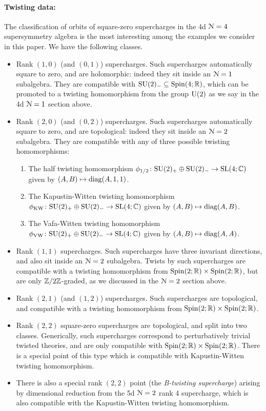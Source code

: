 \documentclass[10pt, oneside]{article}
\begin{document}
\paragraph{Twisting data:}
The classification of orbits of square-zero supercharges in the 4d $\mathcal{N}=4$ supersymmetry algebra is the most interesting among the examples we consider in this paper.  We have the following classes. 
\begin{itemize}
 \item Rank $(1,0)$ (and $(0,1)$) supercharges.  Such supercharges automatically square to zero, and are holomorphic: indeed they sit inside an $\mathcal{N}=1$ subalgebra.  They are compatible with $\mathrm{SU}(2)_- \subseteq \mathrm{Spin}(4;\mathbb R)$, which can be promoted to a twisting homomorphism from the group $\mathrm{U}(2)$ as we say in the 4d $\mathcal{N}=1$ section above.
 \item Rank $(2,0)$ (and $(0,2)$) supercharges.  Such supercharges automatically square to zero, and are topological: indeed they sit inside an $\mathcal{N}=2$ subalgebra.  They are compatible with any of three possible twisting homomorphisms:
 \begin{enumerate}
  \item The half twisting homomorphism $\phi_{\mathrm{1/2}} \colon \mathrm{SU}(2)_+ \oplus \mathrm{SU}(2)_- \to \mathrm{SL}(4;\mathbb C)$ given by $(A,B) \mapsto \mathrm{diag}(A, 1, 1)$.
  \item The Kapustin-Witten twisting homomorphism $\phi_{\mathrm{KW}} \colon \mathrm{SU}(2)_+ \oplus \mathrm{SU}(2)_- \to \mathrm{SL}(4;\mathbb C)$ given by $(A,B) \mapsto \mathrm{diag}(A, B)$.
  \item The Vafa-Witten twisting homomorphism $\phi_{\mathrm{VW}} \colon \mathrm{SU}(2)_+ \oplus \mathrm{SU}(2)_- \to \mathrm{SL}(4;\mathbb C)$ given by $(A,B) \mapsto \mathrm{diag}(A, A)$.
 \end{enumerate}
 \item Rank $(1,1)$ supercharges.  Such supercharges have three invariant directions, and also sit inside an $\mathcal{N}=2$ subalgebra.  Twists by such supercharges are compatible with a twisting homomorphism from $\mathrm{Spin}(2;\mathbb R) \times \mathrm{Spin}(2;\mathbb R)$, but are only $\mathbb Z/2\mathbb Z$-graded, as we discussed in the $\mathcal{N}=2$ section above.
 \item Rank $(2,1)$ (and $(1,2)$) supercharges.  Such supercharges are topological, and compatible with a twisting homomorphism from $\mathrm{Spin}(2;\mathbb R) \times \mathrm{Spin}(2;\mathbb R)$.
 \item Rank $(2,2)$ square-zero supercharges are topological, and split into two classes.  Generically, such supercharges correspond to perturbatively trivial twisted theories, and are only compatible with $\mathrm{Spin}(2;\mathbb R) \times \mathrm{Spin}(2;\mathbb R)$.  There is a special point of this type which is compatible with Kapustin-Witten twisting homomorphism.
 \item There is also a special rank $(2,2)$ point (the \emph{B-twisting supercharge}) arising by dimensional reduction from the 5d $\mathcal{N}=2$ rank 4 supercharge, which is also compatible with the Kapustin-Witten twisting homomorphism.
\end{itemize}
\end{document}
